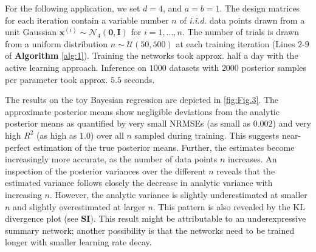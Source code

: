 \documentclass[9pt,twoside,lineno]{pnas-new}
\begin{document}
For the following application, we set $d=4$, and $a=b=1$. The design matrices for each iteration contain a variable number $n$ of \textit{i.i.d.} data points drawn from a unit Gaussian $\boldsymbol{x}^{(i)} \sim \mathcal{N}_{4}(\boldsymbol{0},\boldsymbol{I})$ for $i=1,...,n$. The number of trials is drawn from a uniform distribution $n \sim \mathcal{U}(50, 500)$ at each training iteration (Lines $2$-$9$ of \textbf{Algorithm} \ref{alg:1}). Training the networks took approx. half a day with the active learning approach. Inference on $1000$ datasets with $2000$ posterior samples per parameter took approx. $5.5$ seconds.

The results on the toy Bayesian regression are depicted in \autoref{fig:Fig.3}. The approximate posterior means show negligible deviations from the analytic posterior means as quantified by very small NRMSEs (as small as $0.002$) and very high $R^{2}$ (as high as $1.0$) over all $n$ sampled during training. This suggests near-perfect estimation of the true posterior means. Further, the estimates become increasingly more accurate, as the number of data points $n$ increases. An inspection of the posterior variances over the different $n$ reveals that the estimated variance follows closely the decrease in analytic variance with increasing $n$. However, the analytic variance is slightly underestimated at smaller $n$ and slightly overestimated at larger $n$. This pattern is also revealed by the KL divergence plot (see \textbf{SI}). This result might be attributable to an underexpressive summary network; another possibility is that the networks need to be trained longer with smaller learning rate decay. 
\end{document}
